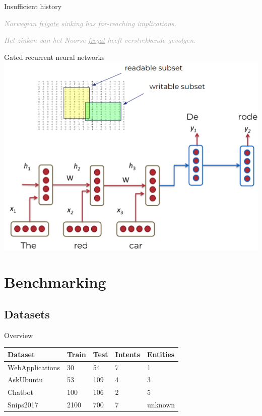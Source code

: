 \documentclass[pdf]{beamer}
\newcommand{\entity}[1]{\textcolor{ao(english)}{#1}}
\newcommand{\intent}[1]{\textcolor{azure(colorwheel)}{#1}}
\newcommand{\demo}[1]{\textit{\textcolor{darkgray}{#1}}}
\begin{document}
    \begin{frame}{Insufficient history}
        \begin{center}
            \demo{Norwegian \underline{frigate} sinking has far-reaching implications.}
        \end{center}
        \begin{center}
            \demo{Het zinken van het Noorse \underline{fregat} heeft verstrekkende gevolgen.}
        \end{center}
    \end{frame}

    \begin{frame}{Gated recurrent neural networks}
        \includegraphics[height=0.9\textheight]{figures/gru.png}
    \end{frame}
    \section{Benchmarking}
    \subsection{Datasets}
    \begin{frame}{Overview}
        \begin{tabular}{l l l l l}
            \textbf{Dataset} & \textbf{Train} & \textbf{Test} & \textbf{\intent{Intents}} & \textbf{\entity{Entities}}\\
            \hline
            WebApplications & 30 & 54 & 7 & 1\\
            AskUbuntu & 53 & 109 & 4 & 3\\
            Chatbot & 100 & 106 & 2 & 5\\
            Snips2017 & 2100 & 700 & 7 & unknown\\
        \end{tabular}
    \end{frame}
\end{document}
